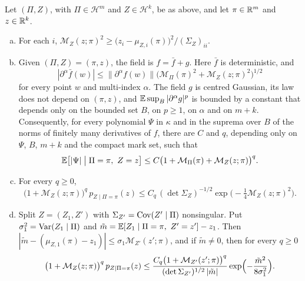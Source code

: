 \begin{lemma}\label{lem:selection-gauss}
Let $(\Pi,Z)$, with $\Pi\in\mathcal H^m$ and $Z\in\mathcal H^k$, be as above, and let $\pi\in\mathbb R^m$ and $z\in\mathbb R^k$.
\begin{enumerate}[(a)]
\item For each $i$, $\mathcal M_Z(z;\pi)^2\ge\bigl(z_i-\mu_{Z,i}(\pi)\bigr)^2/(\Sigma_Z)_{ii}$.
\item Given $(\Pi,Z)=(\pi,z)$, the field is $f=\bar f+g$. Here $\bar f$ is deterministic, and
\[
|\partial^\alpha\bar f(w)|\le\|\partial^\alpha f(w)\|\bigl(\mathcal M_\Pi(\pi)^2+\mathcal M_Z(z;\pi)^2\bigr)^{1/2}
\]
for every point $w$ and multi-index $\alpha$. The field $g$ is centred Gaussian, its law does not depend on $(\pi,z)$, and $\mathbb E\sup_B|\partial^\alpha g|^p$ is bounded by a constant that depends only on the bounded set $B$, on $p\ge1$, on $\alpha$ and on $m+k$. Consequently, for every polynomial $\Psi$ in $\kappa$ and in the suprema over $B$ of the norms of finitely many derivatives of $f$, there are $C$ and $q$, depending only on $\Psi$, $B$, $m+k$ and the compact mark set, such that
\[
\mathbb E\bigl[|\Psi|\bigm|\Pi=\pi,\ Z=z\bigr]\le C\bigl(1+\mathcal M_\Pi(\pi)+\mathcal M_Z(z;\pi)\bigr)^q .
\]
\item For every $q\ge0$,
\begin{equation}\label{eq:selection-gaussjoint}
\bigl(1+\mathcal M_Z(z;\pi)\bigr)^q\,p_{Z\mid\Pi=\pi}(z)\le C_q\,(\det\Sigma_Z)^{-1/2}\exp\bigl(-\tfrac14\mathcal M_Z(z;\pi)^2\bigr).
\end{equation}
\item Split $Z=(Z_1,Z')$ with $\Sigma_{Z'}=\operatorname{Cov}(Z'\mid\Pi)$ nonsingular. Put $\sigma_1^2=\operatorname{Var}(Z_1\mid\Pi)$ and $\tilde m=\mathbb E[Z_1\mid\Pi=\pi,\ Z'=z']-z_1$. Then $|\tilde m-(\mu_{Z,1}(\pi)-z_1)|\le\sigma_1\mathcal M_{Z'}(z';\pi)$, and if $\tilde m\ne0$, then for every $q\ge0$
\begin{equation}\label{eq:selection-gaussone}
\bigl(1+\mathcal M_Z(z;\pi)\bigr)^q\,p_{Z\mid\Pi=\pi}(z)\le\frac{C_q\bigl(1+\mathcal M_{Z'}(z';\pi)\bigr)^q}{(\det\Sigma_{Z'})^{1/2}\,|\tilde m|}\exp\Bigl(-\frac{\tilde m^2}{8\sigma_1^2}\Bigr).
\end{equation}
\end{enumerate}
\end{lemma}


